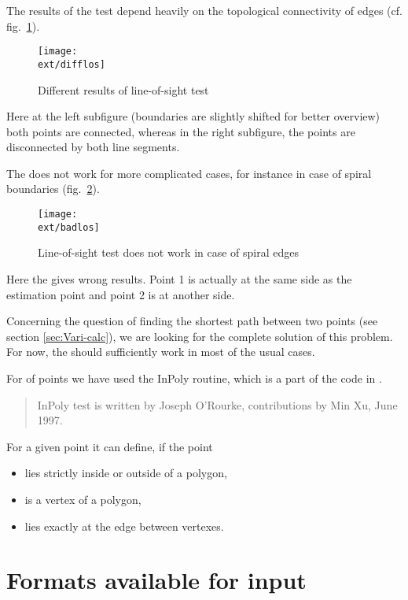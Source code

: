 The results of the test depend heavily on the topological connectivity
of edges (cf.  fig.~\ref{fig:difflos}).

\begin{figure}[htbp]
  \centering
  \texttt{[image: \\ext/difflos]}
  \caption{Different results of line-of-sight test}
  \label{fig:difflos}
\end{figure}

Here at the left subfigure (boundaries are slightly shifted for better
overview) both points are connected, whereas in the right subfigure,
the points are disconnected by both line segments.

The \lost{} does not work for more complicated cases, for instance in
case of spiral boundaries (fig.~\ref{fig:badlos}).
\begin{figure}[htbp]
  \centering
  \texttt{[image: \\ext/badlos]}
  \caption{Line-of-sight test does not work in case of spiral edges}
  \label{fig:badlos}
\end{figure}

Here the \lost{} gives wrong results. Point 1 is actually at the same
side as the estimation point and point 2 is at another side.

Concerning the question of finding the shortest path between two
points (see section \ref{sec:Vari-calc}), we are looking for the
complete solution of this problem. For now, the \lost{} should
sufficiently work in most of the usual cases.

For \pipt{} of points we have used the InPoly routine,
which is a part of the code in  \cite{rourke:compgeom}.

\begin{quote}
  InPoly test is written by Joseph O'Rourke, contributions by Min Xu,
  June 1997.
\end{quote}

For a given point it can define, if the point
\begin{itemize}
\item lies strictly inside or outside of a polygon,
\item is a vertex of a polygon,
\item lies exactly at the edge between vertexes.
\end{itemize}

\section{Formats available for input}
\label{sec:Form-avail-input}

